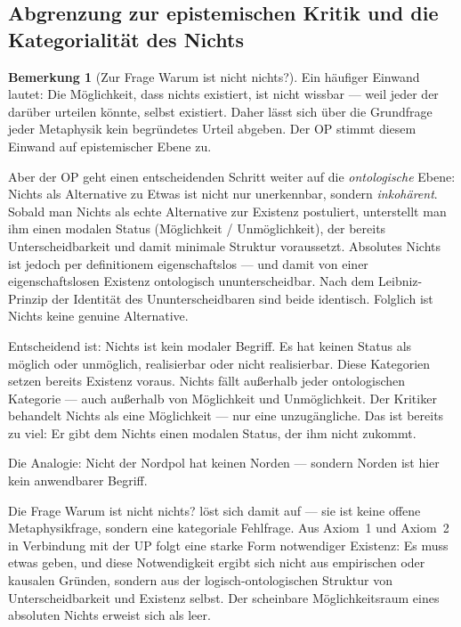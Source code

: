 \documentclass[11pt,a4paper]{article}
\theoremstyle{plain}
\theoremstyle{definition}
\newtheorem{remark}{Bemerkung}[section]
\begin{document}
\subsection{Abgrenzung zur epistemischen Kritik und die Kategorialit\"{a}t des Nichts}

\begin{remark}[Zur Frage \glqq{}Warum ist nicht nichts?\grqq{}]
Ein h\"{a}ufiger Einwand lautet: \glqq{}Die M\"{o}glichkeit, dass nichts existiert, ist
nicht wissbar --- weil jeder der dar\"{u}ber urteilen k\"{o}nnte, selbst existiert.
Daher l\"{a}sst sich \"{u}ber die Grundfrage jeder Metaphysik kein begr\"{u}ndetes
Urteil abgeben.\grqq{} Der OP stimmt diesem Einwand auf epistemischer Ebene zu.

Aber der OP geht einen entscheidenden Schritt weiter auf die \emph{ontologische} Ebene:
Nichts als Alternative zu Etwas ist nicht nur unerkennbar, sondern \emph{inkoh\"{a}rent}.
Sobald man \glqq{}Nichts\grqq{} als echte Alternative zur Existenz postuliert, unterstellt
man ihm einen modalen Status (M\"{o}glichkeit / Unm\"{o}glichkeit), der bereits
Unterscheidbarkeit und damit minimale Struktur voraussetzt. Absolutes Nichts ist jedoch
per definitionem eigenschaftslos --- und damit von einer eigenschaftslosen Existenz
ontologisch ununterscheidbar. Nach dem Leibniz-Prinzip der Identit\"{a}t des
Ununterscheidbaren sind beide identisch. Folglich ist \glqq{}Nichts\grqq{} keine genuine
Alternative.

Entscheidend ist: \glqq{}Nichts\grqq{} ist kein modaler Begriff. Es hat keinen Status
als m\"{o}glich oder unm\"{o}glich, realisierbar oder nicht realisierbar. Diese Kategorien
setzen bereits Existenz voraus. \glqq{}Nichts\grqq{} f\"{a}llt au\ss{}erhalb jeder
ontologischen Kategorie --- auch au\ss{}erhalb von M\"{o}glichkeit und Unm\"{o}glichkeit.
Der Kritiker behandelt Nichts als eine M\"{o}glichkeit --- nur eine unzug\"{a}ngliche.
Das ist bereits zu viel: Er gibt dem Nichts einen modalen Status, der ihm nicht zukommt.

Die Analogie: Nicht \glqq{}der Nordpol hat keinen Norden\grqq{} --- sondern
\glqq{}Norden ist hier kein anwendbarer Begriff\grqq{}.

Die Frage \glqq{}Warum ist nicht nichts?\grqq{} l\"{o}st sich damit auf --- sie ist
keine offene Metaphysikfrage, sondern eine kategoriale Fehlfrage. Aus Axiom~1 und
Axiom~2 in Verbindung mit der UP folgt eine starke Form notwendiger Existenz: Es muss
etwas geben, und diese Notwendigkeit ergibt sich nicht aus empirischen oder kausalen
Gr\"{u}nden, sondern aus der logisch-ontologischen Struktur von Unterscheidbarkeit und
Existenz selbst. Der scheinbare M\"{o}glichkeitsraum eines absoluten Nichts erweist sich
als leer.
\end{remark}
\end{document}
